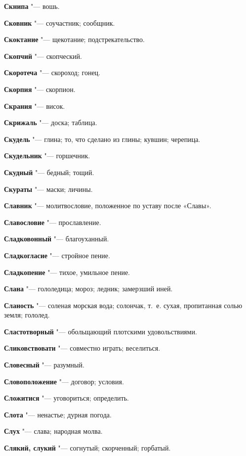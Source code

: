 \begin{mymulticols}
\noindent\textbf{Скнипа} "--- вошь. 

\noindent\textbf{Сковник} "--- соучастник; сообщник. 

\noindent\textbf{Скоктание} "--- щекотание; подстрекательство. 

\noindent\textbf{Скопчий} "--- скопческий. 

\noindent\textbf{Скоротеча} "--- скороход; гонец. 

\noindent\textbf{Скорпия} "--- скорпион. 

\noindent\textbf{Скрания} "--- висок. 

\noindent\textbf{Скрижаль} "--- доска; таблица. 

\noindent\textbf{Скудель} "--- глина; то, что сделано из глины; кувшин; черепица. 

\noindent\textbf{Скудельник} "--- горшечник. 

\noindent\textbf{Скудный} "--- бедный; тощий. 

\noindent\textbf{Скураты} "--- маски; личины. 

\noindent\textbf{Славник} "--- молитвословие, положенное по уставу после «Славы». 

\noindent\textbf{Славословие} "--- прославление. 

\noindent\textbf{Сладковонный} "--- благоуханный. 

\noindent\textbf{Сладкогласие} "--- стройное пение. 

\noindent\textbf{Сладкопение} "--- тихое, умильное пение. 

\noindent\textbf{Слана} "--- гололедица; мороз; ледник; замерзший иней. 

\noindent\textbf{Сланость} "--- соленая морская вода; солончак, т.~е. сухая, пропитанная солью земля; гололед. 

\noindent\textbf{Сластотворный} "--- обольщающий плотскими удовольствиями. 

\noindent\textbf{Сликовствовати} "--- совместно играть; веселиться. 

\noindent\textbf{Словесный} "--- разумный. 

\noindent\textbf{Словоположение} "--- договор; условия. 

\noindent\textbf{Сложитися} "--- уговориться; определить. 

\noindent\textbf{Слота} "--- ненастье; дурная погода. 

\noindent\textbf{Слух} "--- слава; народная молва. 

\noindent\textbf{Слякий, слукий} "--- согнутый; скорченный; горбатый. 


\end{mymulticols}
